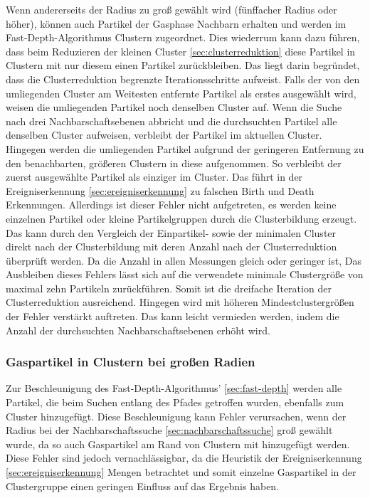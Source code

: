 Wenn andererseits der Radius zu groß gewählt wird (fünffacher Radius oder höher), können auch Partikel der Gasphase Nachbarn erhalten und werden im Fast-Depth-Algorithmus Clustern zugeordnet. Dies wiederrum kann dazu führen, dass beim Reduzieren der kleinen Cluster \autoref{sec:clusterreduktion} diese Partikel in Clustern mit nur diesem einen Partikel zurückbleiben. Das liegt darin begründet, dass die Clusterreduktion begrenzte Iterationsschritte aufweist. Falls der von den umliegenden Cluster am Weitesten entfernte Partikel als erstes ausgewählt wird, weisen die umliegenden Partikel noch denselben Cluster auf. Wenn die Suche nach drei Nachbarschaftsebenen abbricht und die durchsuchten Partikel alle denselben Cluster aufweisen, verbleibt der Partikel im aktuellen Cluster. Hingegen werden die umliegenden Partikel aufgrund der geringeren Entfernung zu den benachbarten, größeren Clustern in diese aufgenommen. So verbleibt der zuerst ausgewählte Partikel als einziger im Cluster. Das führt in der Ereigniserkennung \autoref{sec:ereigniserkennung} zu falschen Birth und Death Erkennungen.
Allerdings ist dieser Fehler nicht aufgetreten, es werden keine einzelnen Partikel oder kleine Partikelgruppen durch die Clusterbildung erzeugt. %
Das kann durch den Vergleich der Einpartikel- sowie der minimalen Cluster direkt nach der Clusterbildung mit deren Anzahl nach der Clusterreduktion überprüft werden. Da die Anzahl in allen Messungen gleich oder geringer ist, %
Das Ausbleiben dieses Fehlers lässt sich auf die verwendete minimale Clustergröße von maximal zehn Partikeln zurückführen. Somit ist die dreifache Iteration der Clusterreduktion ausreichend. Hingegen wird mit höheren Mindestclustergrößen der Fehler verstärkt auftreten. Das kann leicht vermieden werden, indem die Anzahl der durchsuchten Nachbarschaftsebenen erhöht wird.

\subsubsection*{Gaspartikel in Clustern bei großen Radien}

Zur Beschleunigung des Fast-Depth-Algorithmus' \autoref{sec:fast-depth} werden alle Partikel, die beim Suchen entlang des Pfades getroffen wurden, ebenfalls zum Cluster hinzugefügt. Diese Beschleunigung kann Fehler verursachen, wenn der Radius bei der Nachbarschaftssuche \autoref{sec:nachbarschaftssuche} groß gewählt wurde, da so auch Gaspartikel am Rand von Clustern mit hinzugefügt werden. Diese Fehler sind jedoch vernachlässigbar, da die Heuristik der Ereigniserkennung \autoref{sec:ereigniserkennung} Mengen betrachtet und somit einzelne Gaspartikel in der Clustergruppe einen geringen Einfluss auf das Ergebnis haben.

